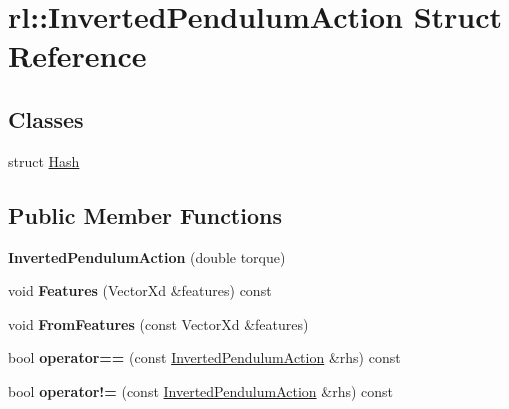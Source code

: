 \hypertarget{structrl_1_1_inverted_pendulum_action}{}\section{rl\+:\+:Inverted\+Pendulum\+Action Struct Reference}
\label{structrl_1_1_inverted_pendulum_action}
\subsection*{Classes}
\begin{DoxyCompactItemize}
\item 
struct \hyperlink{structrl_1_1_inverted_pendulum_action_1_1_hash}{Hash}
\end{DoxyCompactItemize}
\subsection*{Public Member Functions}
\begin{DoxyCompactItemize}
\item 
\hypertarget{structrl_1_1_inverted_pendulum_action_a190a9ecac695bc5df25941fd0b31b8e4}{}\label{structrl_1_1_inverted_pendulum_action_a190a9ecac695bc5df25941fd0b31b8e4} 
{\bfseries Inverted\+Pendulum\+Action} (double torque)
\item 
\hypertarget{structrl_1_1_inverted_pendulum_action_a88975dbb6741e411335a3b864147555e}{}\label{structrl_1_1_inverted_pendulum_action_a88975dbb6741e411335a3b864147555e} 
void {\bfseries Features} (Vector\+Xd \&features) const
\item 
\hypertarget{structrl_1_1_inverted_pendulum_action_a5c5e2c4944c1445539a3a8befb685570}{}\label{structrl_1_1_inverted_pendulum_action_a5c5e2c4944c1445539a3a8befb685570} 
void {\bfseries From\+Features} (const Vector\+Xd \&features)
\item 
\hypertarget{structrl_1_1_inverted_pendulum_action_aec8902ca65267c3cf3112c19e45c7ce6}{}\label{structrl_1_1_inverted_pendulum_action_aec8902ca65267c3cf3112c19e45c7ce6} 
bool {\bfseries operator==} (const \hyperlink{structrl_1_1_inverted_pendulum_action}{Inverted\+Pendulum\+Action} \&rhs) const
\item 
\hypertarget{structrl_1_1_inverted_pendulum_action_abf6659b246c13e9892ee60cff709cd98}{}\label{structrl_1_1_inverted_pendulum_action_abf6659b246c13e9892ee60cff709cd98} 
bool {\bfseries operator!=} (const \hyperlink{structrl_1_1_inverted_pendulum_action}{Inverted\+Pendulum\+Action} \&rhs) const
\end{DoxyCompactItemize}
